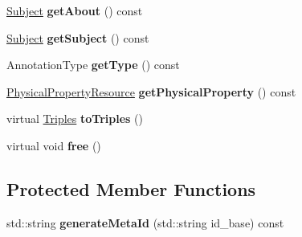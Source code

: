 \begin{DoxyCompactItemize}
\hyperlink{classsemsim_1_1Subject}{Subject} {\bfseries get\+About} () const
\item 
\mbox{\label{classsemsim_1_1PhysicalPhenomenon_ae56630b175214b2196da1bf47a3c47c0}} 
\hyperlink{classsemsim_1_1Subject}{Subject} {\bfseries get\+Subject} () const
\item 
\mbox{\label{classsemsim_1_1PhysicalPhenomenon_a3fc27dfe9bedd3055c575e134c537d6e}} 
Annotation\+Type {\bfseries get\+Type} () const
\item 
\mbox{\label{classsemsim_1_1PhysicalPhenomenon_ac0b9bb899a6bd02275b5b4d106f875ea}} 
\hyperlink{classsemsim_1_1PhysicalPropertyResource}{Physical\+Property\+Resource} {\bfseries get\+Physical\+Property} () const
\item 
\mbox{\label{classsemsim_1_1PhysicalPhenomenon_ac6857e2bf2a550c3f52037d3e74191c9}} 
virtual \hyperlink{classsemsim_1_1Triples}{Triples} {\bfseries to\+Triples} ()
\item 
\mbox{\label{classsemsim_1_1PhysicalPhenomenon_aeaf66bcc989cb6b736a8611903ab7b74}} 
virtual void {\bfseries free} ()
\end{DoxyCompactItemize}
\subsection*{Protected Member Functions}
\begin{DoxyCompactItemize}
\item 
\mbox{\label{classsemsim_1_1PhysicalPhenomenon_a930e9d0f75ec3a7bdbcb2dbce1a47716}} 
std\+::string {\bfseries generate\+Meta\+Id} (std\+::string id\+\_\+base) const
\end{DoxyCompactItemize}

